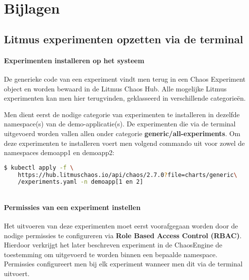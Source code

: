 
\chapter{Bijlagen}
\label{ch:bijlagen}

\section{Litmus experimenten opzetten via de terminal}
\label{ch:litmusexpterminal}

\subsubsection{Experimenten installeren op het systeem}
\label{subsec:experimenteninstalleren}

De generieke code van een experiment vindt men terug in een Chaos Experiment object en worden bewaard in de Litmus Chaos Hub.  
Alle mogelijke Litmus experimenten kan men hier terugvinden, geklasseerd in verschillende categorieën. \autocite{ChaosHub2022} 

Men dient eerst de nodige categorie van experimenten te installeren in dezelfde namespace(s) van de demo-applicatie(s). De experimenten die via de terminal uitgevoerd worden vallen allen onder categorie {\bf generic/all-experiments}. \newline Om deze experimenten te installeren voert men volgend commando uit voor zowel de namespaces demoapp1 en demoapp2:
\begin{lstlisting}[language=bash]
    $ kubectl apply -f \
    https://hub.litmuschaos.io/api/chaos/2.7.0?file=charts/generic\
    /experiments.yaml -n demoapp[1 en 2]
    
\end{lstlisting}

\subsubsection{Permissies van een experiment instellen}

Het uitvoeren van deze experimenten moet eerst voorafgegaan worden door de nodige permissies te configureren via {\bf Role Based Access Control (RBAC)}. Hierdoor verkrijgt het later beschreven experiment in de ChaosEngine de toestemming om uitgevoerd te worden binnen een bepaalde namespace. Permissies configureert men bij elk experiment wanneer men dit via de terminal uitvoert. 

